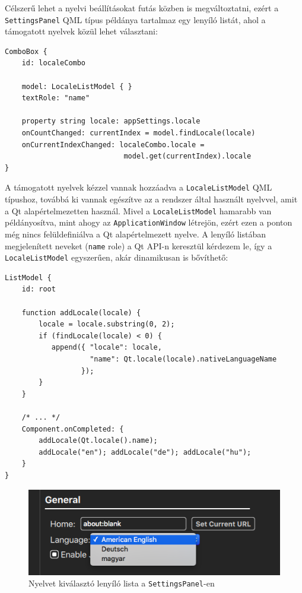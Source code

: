 \documentclass[12pt]{report}
\begin{document}
Célszerű lehet a nyelvi beállításokat futás közben is megváltoztatni, ezért a \\
\texttt{SettingsPanel} QML típus példánya tartalmaz egy lenyíló listát, ahol a támogatott
nyelvek közül lehet választani:
\begin{lstlisting}[title=main.qml]
ComboBox {
    id: localeCombo

    model: LocaleListModel { }
    textRole: "name"

    property string locale: appSettings.locale
    onCountChanged: currentIndex = model.findLocale(locale)
    onCurrentIndexChanged: localeCombo.locale =
                            model.get(currentIndex).locale
}
\end{lstlisting}
A támogatott nyelvek kézzel vannak hozzáadva a \texttt{LocaleListModel} QML típushoz, továbbá
ki vannak egészítve az a rendszer által használt nyelvvel, amit a Qt alapértelmezetten
használ. Mivel a \texttt{LocaleListModel} hamarabb van példányosítva, mint ahogy az
\texttt{ApplicationWindow} létrejön, ezért ezen a ponton még nincs felüldefiniálva a Qt
alapértelmezett nyelve. A lenyíló listában megjelenített neveket (\texttt{name} role) a
Qt API-n keresztül kérdezem le, így a \texttt{LocaleListModel} egyszerűen, akár dinamikusan
is bővíthető:
\newpage
\begin{lstlisting}[title=models/LocaleListModel.qml]
ListModel {
    id: root

    function addLocale(locale) {
        locale = locale.substring(0, 2);
        if (findLocale(locale) < 0) {
           append({ "locale": locale,
                    "name": Qt.locale(locale).nativeLanguageName
                  });
        }
    }

    /* ... */
    Component.onCompleted: {
        addLocale(Qt.locale().name);
        addLocale("en"); addLocale("de"); addLocale("hu");
    }
}
\end{lstlisting}

\begin{figure}[H]
    \centering
    \includegraphics[scale=0.6]{locale-combo}
    \caption{
        \label{fig:locale-combo}
        Nyelvet kiválasztó lenyíló lista a \texttt{SettingsPanel}-en
    }
\end{figure}
\end{document}
